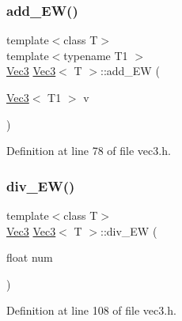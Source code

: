 \mbox{\label{class_vec3_a834f7331fe06f285a5f46211e7ed3ec2}} 
\subsubsection{\texorpdfstring{add\_EW()}{add\_EW()}\hspace{0.1cm}{\footnotesize\ttfamily [2/2]}}
{\footnotesize\ttfamily template$<$class T$>$ \\
template$<$typename T1 $>$ \\
\mbox{\hyperlink{class_vec3}{Vec3}} \mbox{\hyperlink{class_vec3}{Vec3}}$<$ T $>$\+::add\+\_\+\+EW (\begin{DoxyParamCaption}\item[{\mbox{\hyperlink{class_vec3}{Vec3}}$<$ T1 $>$}]{v }\end{DoxyParamCaption})\hspace{0.3cm}{\ttfamily [inline]}}



Definition at line 78 of file vec3.\+h.

\mbox{\label{class_vec3_a6db31460c486f49e40eec82ff488b55e}} 
\subsubsection{\texorpdfstring{div\_EW()}{div\_EW()}\hspace{0.1cm}{\footnotesize\ttfamily [1/2]}}
{\footnotesize\ttfamily template$<$class T$>$ \\
\mbox{\hyperlink{class_vec3}{Vec3}} \mbox{\hyperlink{class_vec3}{Vec3}}$<$ T $>$\+::div\+\_\+\+EW (\begin{DoxyParamCaption}\item[{float}]{num }\end{DoxyParamCaption})\hspace{0.3cm}{\ttfamily [inline]}}



Definition at line 108 of file vec3.\+h.

\mbox{\label{class_vec3_a8ff6abb7455120c1884bf126e2083d29}} 
